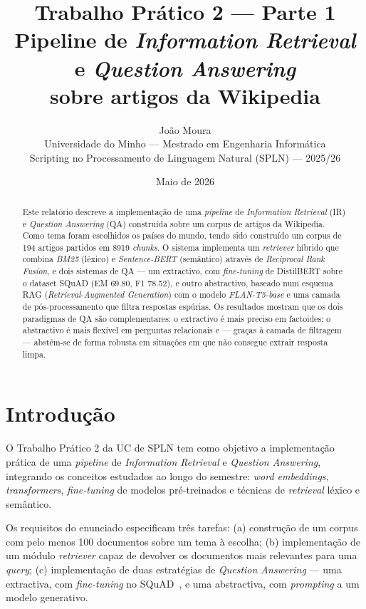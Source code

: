 \documentclass[11pt,a4paper]{article}
\title{
  \vspace{-1.5cm}
  \textbf{Trabalho Prático 2 --- Parte 1} \\
  \large Pipeline de \emph{Information Retrieval} e \emph{Question Answering}\\
  \large sobre artigos da Wikipedia
}
\author{
  João Moura \\
  \small Universidade do Minho --- Mestrado em Engenharia Informática \\
  \small Scripting no Processamento de Linguagem Natural (SPLN) --- 2025/26
}
\date{Maio de 2026}
\begin{document}
\maketitle

\vspace{-0.7cm}

\begin{abstract}
\noindent Este relatório descreve a implementação de uma \emph{pipeline} de \emph{Information Retrieval} (IR) e \emph{Question Answering} (QA) construída sobre um corpus de artigos da Wikipedia. Como tema foram escolhidos os países do mundo, tendo sido construído um corpus de 194 artigos partidos em 8919 \emph{chunks}. O sistema implementa um \emph{retriever} híbrido que combina \emph{BM25} (léxico) e \emph{Sentence-BERT} (semântico) através de \emph{Reciprocal Rank Fusion}, e dois sistemas de QA --- um extractivo, com \emph{fine-tuning} de DistilBERT sobre o dataset SQuAD (EM 69.80, F1 78.52), e outro abstractivo, baseado num esquema RAG (\emph{Retrieval-Augmented Generation}) com o modelo \emph{FLAN-T5-base} e uma camada de pós-processamento que filtra respostas espúrias. Os resultados mostram que os dois paradigmas de QA são complementares: o extractivo é mais preciso em factoides; o abstractivo é mais flexível em perguntas relacionais e --- graças à camada de filtragem --- abstém-se de forma robusta em situações em que não consegue extrair resposta limpa.
\end{abstract}

\vspace{0.3cm}

\section{Introdução}

O Trabalho Prático 2 da UC de SPLN tem como objetivo a implementação prática de uma \emph{pipeline} de \emph{Information Retrieval} e \emph{Question Answering}, integrando os conceitos estudados ao longo do semestre: \emph{word embeddings}, \emph{transformers}, \emph{fine-tuning} de modelos pré-treinados e técnicas de \emph{retrieval} léxico e semântico.

Os requisitos do enunciado especificam três tarefas: (a) construção de um corpus com pelo menos 100 documentos sobre um tema à escolha; (b) implementação de um módulo \emph{retriever} capaz de devolver os documentos mais relevantes para uma \emph{query}; (c) implementação de duas estratégias de \emph{Question Answering} --- uma extractiva, com \emph{fine-tuning} no SQuAD~\cite{squad}, e uma abstractiva, com \emph{prompting} a um modelo generativo.
\end{document}
